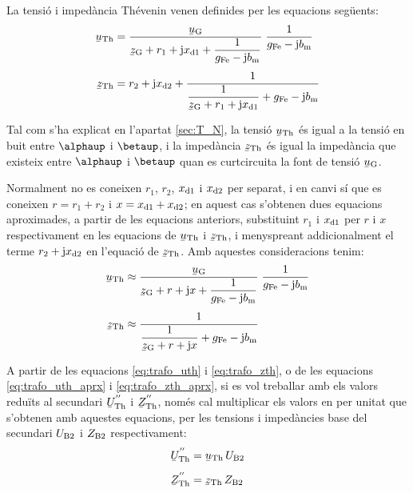 La tensió i impedància Thévenin venen definides per les equacions
següents:
\begin{align}
    \cmplx{u}\ped{Th} &= \frac{\cmplx{u}\ped{G}}{\cmplx{z}\ped{G} + r_1 + \ju
    x\ped{d1} + \dfrac{1}{g\ped{Fe}-\ju b\ped{m}}} \;\frac{1}{g\ped{Fe}-\ju
    b\ped{m}} \label{eq:trafo_uth}\\[1ex]
    \cmplx{z}\ped{Th} &= r_2 + \ju x\ped{d2} + \frac{1}{\dfrac{1}{\cmplx{z}\ped{G} + r_1 +
    \ju x\ped{d1}} + g\ped{Fe}-\ju b\ped{m}}\label{eq:trafo_zth}
\end{align}

Tal com s'ha explicat en l'apartat \vref{sec:T_N}, la tensió
$\cmplx{u}\ped{Th}$ és igual a la tensió en buit entre $\alphaup$ i
$\betaup$, i la impedància $\cmplx{z}\ped{Th}$ és igual la impedància
que existeix entre $\alphaup$ i $\betaup$ quan es curtcircuita la font
de tensió $\cmplx{u}\ped{G}$.

Normalment no es coneixen $r_1$, $r_2$, $x_\mathrm{d1}$ i $x_\mathrm{d2}$ per separat, i
en canvi sí que es coneixen $r=r_1+r_2$ i $x=x_\mathrm{d1}+x_\mathrm{d2}$; en aquest
cas s'obtenen dues equacions aproximades, a partir de les equacions
anteriors, substituint $r_1$ i $x_\mathrm{d1}$ per $r$ i $x$ respectivament en
les equacions de $\cmplx{u}\ped{Th}$ i $\cmplx{z}\ped{Th}$, i
menyspreant addicionalment el terme $r_2 + \mathrm{j} x_\mathrm{d2}$ en l'equació
de $\cmplx{z}\ped{Th}$. Amb aquestes consideracions tenim:
\begin{align}
    \cmplx{u}\ped{Th} &\approx \frac{\cmplx{u}\ped{G}}{\cmplx{z}\ped{G} + r + \ju
    x + \dfrac{1}{g\ped{Fe}-\ju b\ped{m}}} \;\frac{1}{g\ped{Fe}-\ju
    b\ped{m}} \label{eq:trafo_uth_aprx}\\[1ex]
    \cmplx{z}\ped{Th} &\approx \frac{1}{\dfrac{1}{\cmplx{z}\ped{G} + r +
    \ju x} + g\ped{Fe}-\ju b\ped{m}}\label{eq:trafo_zth_aprx}
\end{align}

A partir de les equacions \eqref{eq:trafo_uth} i
\eqref{eq:trafo_zth}, o de les equacions \eqref{eq:trafo_uth_aprx} i
\eqref{eq:trafo_zth_aprx}, si es vol treballar amb els valors
reduïts al secundari $\cmplx{U}\ped{Th}^{''}$ i
$\cmplx{Z}\ped{Th}^{''}$, només cal multiplicar els valors en per unitat
que s'obtenen amb aquestes equacions, per les tensions i impedàncies
base del secundari $U_\mathrm{B2}$ i $Z_\mathrm{B2}$ respectivament:
\begin{align}
    \cmplx{U}\ped{Th}^{''} &= \cmplx{u}\ped{Th} \, U\ped{B2} \\[1ex]
    \cmplx{Z}\ped{Th}^{''} &= \cmplx{z}\ped{Th} \, Z\ped{B2}
\end{align}


